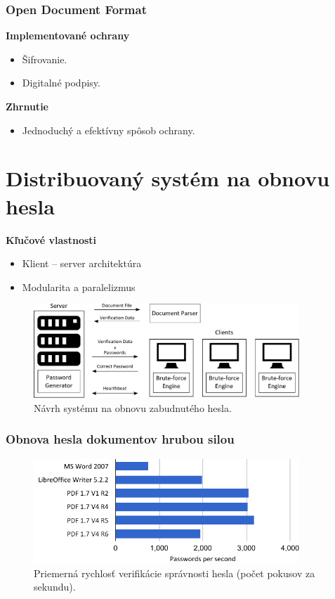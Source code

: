 \documentclass[xcolor=dvipsnames]{beamer}
\def\itemtitle#1{{\bfseries#1\smallskip}}
\begin{document}
\begin{frame}
	\frametitle{Open Document Format}
	\itemtitle{Implementované ochrany}
	\begin{itemize}
		\item Šifrovanie.
		\item Digitalné podpisy.
	\end{itemize}
	\bigskip
	\itemtitle{Zhrnutie}
	\begin{itemize}
		\item Jednoduchý a efektívny spôsob ochrany.  
	\end{itemize}
\end{frame}


\section{Distribuovaný systém na obnovu hesla}
\begin{frame}
	\itemtitle{Kľučové vlastnosti}
	\begin{itemize}
		\item Klient -- server architektúra
		\item Modularita a paralelizmus
	\end{itemize}
	\bigskip
	\begin{figure}[h]
		\centering
		\includegraphics[width=100mm]{images/ddpbf_design.pdf} \\	
		\scriptsize{Návrh systému na obnovu zabudnutého hesla.}	
	\end{figure}
\end{frame}


\begin{frame}
	\frametitle{Obnova hesla dokumentov hrubou silou}
	
	\begin{figure}[h]
		\centering
		\includegraphics[width=100mm]{images/average_speed.pdf} \\	
		\bigskip
		\scriptsize{Priemerná rychlosť verifikácie správnosti hesla (počet pokusov za sekundu).}	
	\end{figure}
\end{frame}
\end{document}
